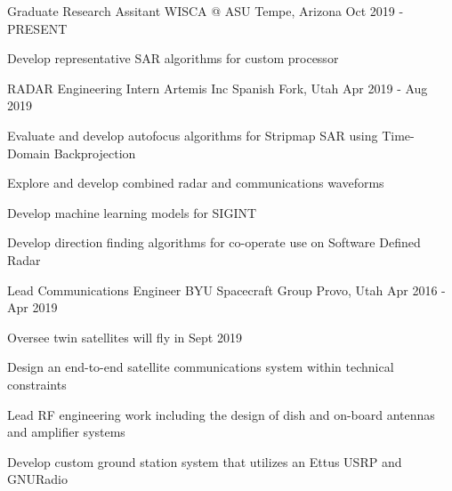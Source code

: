 

\begin{cventries}
    \cventry
    {Graduate Research Assitant} %
    {WISCA @ ASU} %
    {Tempe, Arizona} %
    {Oct 2019 - PRESENT} %
    {
        \begin{cvitems} %
        \item {Develop representative SAR algorithms for custom processor}
        \end{cvitems}
    }

    \cventry
    {RADAR Engineering Intern} %
    {Artemis Inc} %
    {Spanish Fork, Utah} %
    {Apr 2019 - Aug 2019} %
    {
        \begin{cvitems} %
        \item {Evaluate and develop autofocus algorithms for Stripmap SAR using Time-Domain Backprojection}
        \item {Explore and develop combined radar and communications waveforms}
        \item {Develop machine learning models for SIGINT}
        \item {Develop direction finding algorithms for co-operate use on Software Defined Radar}
        \end{cvitems}
    }

    \cventry
    {Lead Communications Engineer} %
    {BYU Spacecraft Group} %
    {Provo, Utah} %
    {Apr 2016 - Apr 2019} %
    {
        \begin{cvitems} %
        \item {Oversee twin satellites will fly in Sept 2019}
        \item {Design an end-to-end satellite communications system within technical constraints}
        \item {Lead RF engineering work including the design of dish and on-board antennas and amplifier systems}
        \item {Develop custom ground station system that utilizes an Ettus USRP and GNURadio}
        \end{cvitems}
    }


\end{cventries}
